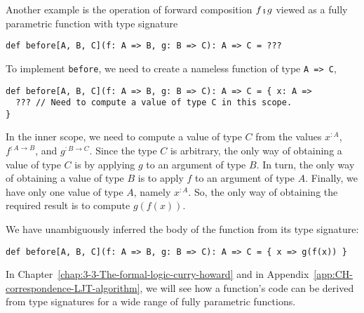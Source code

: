 Another example is the operation of forward composition $f\bef g$
viewed as a fully parametric function with type signature
\begin{lstlisting}
def before[A, B, C](f: A => B, g: B => C): A => C = ???
\end{lstlisting}
To implement \lstinline!before!, we need to create a nameless function
of type \lstinline!A => C!,
\begin{lstlisting}
def before[A, B, C](f: A => B, g: B => C): A => C = { x: A =>
  ??? // Need to compute a value of type C in this scope.
}
\end{lstlisting}
In the inner scope, we need to compute a value of type $C$ from the
values $x^{:A}$, $f^{:A\rightarrow B}$, and $g^{:B\rightarrow C}$.
Since the type $C$ is arbitrary, the only way of obtaining a value
of type $C$ is by applying $g$ to an argument of type $B$. In turn,
the only way of obtaining a value of type $B$ is to apply $f$ to
an argument of type $A$. Finally, we have only one value of type
$A$, namely $x^{:A}$. So, the only way of obtaining the required
result is to compute $g(f(x))$.

We have unambiguously inferred the body of the function from its type
signature:
\begin{lstlisting}
def before[A, B, C](f: A => B, g: B => C): A => C = { x => g(f(x)) }
\end{lstlisting}

In Chapter~\ref{chap:3-3-The-formal-logic-curry-howard} and in Appendix~\ref{app:CH-correspondence-LJT-algorithm},
we will see how a function's code can be derived from type signatures
for a wide range of fully parametric functions.
